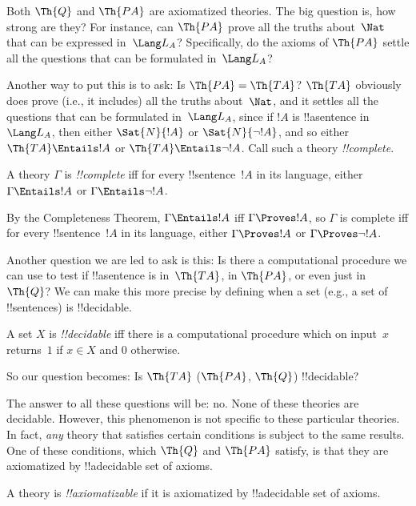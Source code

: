 \documentclass[../../../include/open-logic-section]{subfiles}
\begin{document}
Both $\Th{Q}$ and $\Th{PA}$ are axiomatized theories.  The big
question is, how strong are they? For instance, can $\Th{PA}$ prove
all the truths about~$\Nat$ that can be expressed in~$\Lang L_A$?
Specifically, do the axioms of $\Th{PA}$ settle all the questions
that can be formulated in~$\Lang L_A$?

Another way to put this is to ask: Is $\Th{PA} = \Th{TA}$?
$\Th{TA}$ obviously does prove (i.e., it includes) all the truths
about~$\Nat$, and it settles all the questions that can be formulated
in~$\Lang L_A$, since if $!A$ is !!a{sentence} in $\Lang L_A$, then
either $\Sat{N}{!A}$ or $\Sat{N}{\lnot !A}$, and so either $\Th{TA}
\Entails !A$ or $\Th{TA} \Entails \lnot !A$.  Call such a theory
\emph{!!{complete}}.

\begin{defn}
A theory $\Gamma$ is \emph{!!{complete}} iff for every
!!{sentence}~$!A$ in its language, either $\Gamma \Entails !A$ or
$\Gamma \Entails \lnot !A$.
\end{defn}

\begin{explain}
By the Completeness Theorem, $\Gamma \Entails !A$ iff $\Gamma \Proves
!A$, so $\Gamma$ is complete iff for every !!{sentence}~$!A$ in its
language, either $\Gamma \Proves !A$ or $\Gamma \Proves \lnot !A$.
\end{explain}

Another question we are led to ask is this: Is there a computational
procedure we can use to test if !!a{sentence} is in~$\Th{TA}$, in
$\Th{PA}$, or even just in~$\Th{Q}$?  We can make this more precise
by defining when a set (e.g., a set of !!{sentence}s) is
!!{decidable}.

\begin{defn}
A set $X$ is \emph{!!{decidable}} iff there is a computational procedure
which on input~$x$ returns~$1$ if $x \in X$ and $0$ otherwise.
\end{defn}

So our question becomes: Is $\Th{TA}$ ($\Th{PA}$, $\Th{Q}$) !!{decidable}?

The answer to all these questions will be: no. None of these theories
are decidable. However, this phenomenon is not specific to these
particular theories. In fact, \emph{any} theory that satisfies certain
conditions is subject to the same results. One of these conditions,
which $\Th{Q}$ and $\Th{PA}$ satisfy, is that they are axiomatized by
!!a{decidable} set of axioms.

\begin{defn}
A theory is \emph{!!{axiomatizable}} if it is axiomatized
by !!a{decidable} set of axioms.
\end{defn}
\end{document}
